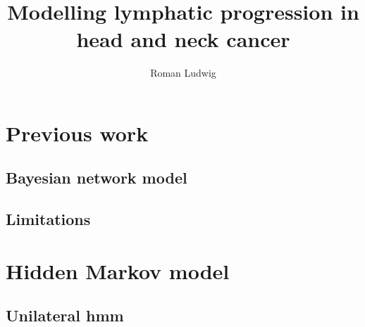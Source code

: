 \documentclass[hyperpdf,bindnopdf]{hepthesis}
\title{Modelling lymphatic progression in head and neck cancer}
\author{Roman Ludwig}
\begin{document}
%     

\begin{mainmatter}
    
    \chapter{Previous work}
    \label{chap:previous_work}
    
    
        \section{Bayesian network model}
        \label{sec:bn_model}
        
        
        \section{Limitations}
        \label{sec:limitations}
        
    
    \chapter{Hidden Markov model}
    \label{chap:hmm_model}
    
        
        \section{Unilateral \gls{hmm}}
        \label{sec:hmm_unilateral}
        
\end{mainmatter}

%     

\begin{backmatter}
    
\end{backmatter}

\end{document}
